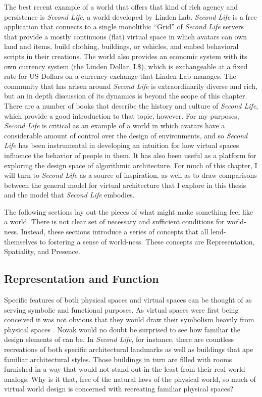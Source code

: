 The best recent example of a world that offers that kind of rich agency and persistence is \emph{Second Life}, a world developed by Linden Lab. \emph{Second Life} is a free application that connects to a single monolithic ``Grid'' of \emph{Second Life} servers that provide a mostly continuous (flat) virtual space in which avatars can own land and items, build clothing, buildings, or vehicles, and embed behavioral scripts in their creations. The world also provides an economic system with its own currency system (the Linden Dollar, L\$), which is exchangeable at a fixed rate for US Dollars on a currency exchange that Linden Lab manages. The community that has arisen around \emph{Second Life} is extraordinarily diverse and rich, but an in depth discussion of its dynamics is beyond the scope of this chapter. There are a number of books that describe the history and culture of \emph{Second Life}, which provide a good introduction to that topic, however. \citep{Au:2008va, Ludlow:2007uu} For my purposes, \emph{Second Life} is critical as an example of a world in which avatars have a considerable amount of control over the design of environments, and so \emph{Second Life} has been instrumental in developing an intuition for how virtual spaces influence the behavior of people in them. It has also been useful as a platform for exploring the design space of algorithmic architecture. For much of this chapter, I will turn to \emph{Second Life} as a source of inspiration, as well as to draw comparisons between the general model for virtual architecture that I explore in this thesis and the model that \emph{Second Life} embodies.

The following sections lay out the pieces of what might make something feel like a world. There is not clear set of necessary and sufficient conditions for world-ness. Instead, these sections introduce a series of concepts that all lend-themselves to fostering a sense of world-ness. These concepts are Representation, Spatiality, and Presence. 

\subsection{Representation and Function}
Specific features of both physical spaces and virtual spaces can be thought of as serving symbolic and functional purposes. As virtual spaces were first being conceived it was not obvious that they would draw their symbolism heavily from physical spaces \citep{Novak:1991ue}. Novak would no doubt be surprised to see how familiar the design elements of can be. In \emph{Second Life}, for instance, there are countless recreations of both specific architectural landmarks as well as buildings that ape familiar architectural styles. Those buildings in turn are filled with rooms furnished in a way that would not stand out in the least from their real world analogs. Why is it that, free of the natural laws of the physical world, so much of virtual world design is concerned with recreating familiar physical spaces?


